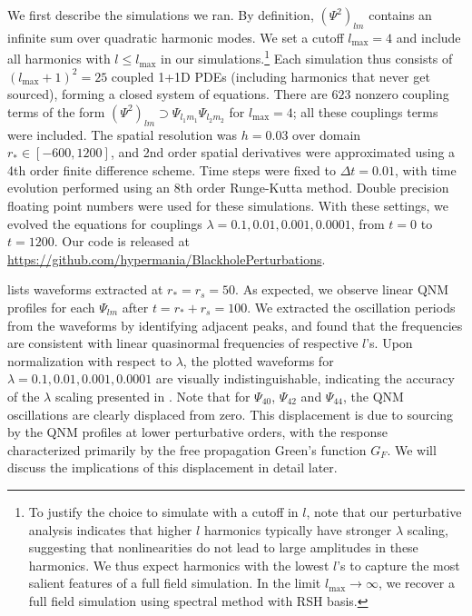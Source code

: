 \label{sec:coupled_simulation_numerical}
We first describe the simulations we ran.
By definition, $(\Psi^2)_{lm}$ contains an infinite sum over quadratic harmonic modes.
We set a cutoff $l_{\mathrm{max}} = 4$ and include all harmonics with $l \leq l_{\mathrm{max}}$ in our simulations.\footnote{To justify the choice to simulate with a cutoff in $l$, note that our perturbative analysis indicates that higher $l$ harmonics typically have stronger $\lambda$ scaling, suggesting that nonlinearities do not lead to large amplitudes in these harmonics. We thus expect harmonics with the lowest $l$'s to capture the most salient features of a full field simulation. In the limit $l_{\mathrm{max}} \to \infty$, we recover a full field simulation using spectral method with RSH basis.}
Each simulation thus consists of $(l_{\mathrm{max}}+1)^2 = 25$ coupled 1+1D PDEs (including harmonics that never get sourced), forming a closed system of equations.
There are $623$ nonzero coupling terms of the form $(\Psi^2)_{lm} \supset \Psi_{l_1 m_1} \Psi_{l_2 m_2}$ for $l_{\mathrm{max}}=4$; all these couplings terms were included.
The spatial resolution was $h = 0.03$ over domain $r_* \in [-600,1200]$, and 2nd order spatial derivatives were approximated using a 4th order finite difference scheme.
Time steps were fixed to $\Delta{t} = 0.01$, with time evolution performed using an 8th order Runge-Kutta method.
Double precision floating point numbers were used for these simulations.
With these settings, we evolved the equations for couplings $\lambda = 0.1, 0.01, 0.001, 0.0001$, from $t=0$ to $t=1200$.
Our code is released at \url{https://github.com/hypermania/BlackholePerturbations}.


 lists waveforms extracted at $r_*=r_s=50$.
As expected, we observe linear QNM profiles for each $\Psi_{lm}$ after $t = r_* + r_s = 100$.
We extracted the oscillation periods from the waveforms by identifying adjacent peaks, and found that the frequencies are consistent with linear quasinormal frequencies of respective $l$'s.
Upon normalization with respect to $\lambda$, the plotted waveforms for $\lambda=0.1, 0.01, 0.001, 0.0001$ are visually indistinguishable, indicating the accuracy of the $\lambda$ scaling presented in .
Note that for $\Psi_{40}$, $\Psi_{42}$ and $\Psi_{44}$, the QNM oscillations are clearly displaced from zero.
This displacement is due to sourcing by the QNM profiles at lower perturbative orders, with the response characterized primarily by the free propagation Green's function $G_F$.
We will discuss the implications of this displacement in detail later.



